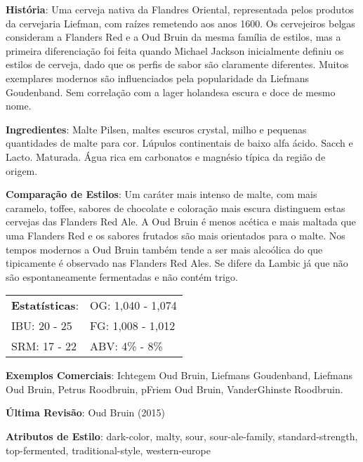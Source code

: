 \textbf{História}: Uma cerveja nativa da Flandres Oriental, representada pelos produtos da cervejaria Liefman, com raízes remetendo aos anos 1600. Os cervejeiros belgas consideram a Flanders Red e a Oud Bruin da mesma família de estilos, mas a primeira diferenciação foi feita quando Michael Jackson inicialmente definiu os estilos de cerveja, dado que os perfis de sabor são claramente diferentes. Muitos exemplares modernos são influenciados pela popularidade da Liefmans Goudenband. Sem correlação com a lager holandesa escura e doce de mesmo nome.

\textbf{Ingredientes}: Malte Pilsen, maltes escuros crystal, milho e pequenas quantidades de malte para cor. Lúpulos continentais de baixo alfa ácido. Sacch e Lacto. Maturada. Água rica em carbonatos e magnésio típica da região de origem.

\textbf{Comparação de Estilos}: Um caráter mais intenso de malte, com mais caramelo, toffee, sabores de chocolate e coloração mais escura distinguem estas cervejas das Flanders Red Ale. A Oud Bruin é menos acética e mais maltada que uma Flanders Red e os sabores frutados são mais orientados para o malte. Nos tempos modernos a Oud Bruin também tende a ser mais alcoólica do que tipicamente é observado nas Flanders Red Ales. Se difere da Lambic já que não são espontaneamente fermentadas e não contém trigo.

\begin{tabular}{@{}p{35mm}p{35mm}@{}}
  \textbf{Estatísticas}: & OG: 1,040 - 1,074 \\
  IBU: 20 - 25  & FG: 1,008 - 1,012  \\
  SRM: 17 - 22  & ABV: 4\% - 8\%
\end{tabular}

\textbf{Exemplos Comerciais}: Ichtegem Oud Bruin, Liefmans Goudenband, Liefmans Oud Bruin, Petrus Roodbruin, pFriem Oud Bruin, VanderGhinste Roodbruin.

\textbf{Última Revisão}: Oud Bruin (2015)

\textbf{Atributos de Estilo}: dark-color, malty, sour, sour-ale-family, standard-strength, top-fermented, traditional-style, western-europe
